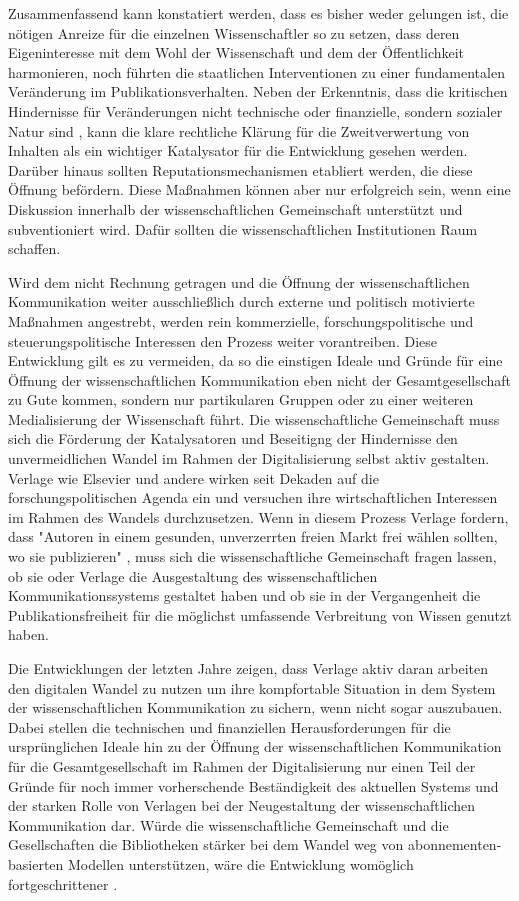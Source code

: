 Zusammenfassend kann konstatiert werden, dass es bisher weder gelungen ist, die nötigen Anreize für die einzelnen Wissenschaftler so zu setzen, dass deren Eigeninteresse mit dem Wohl der Wissenschaft und dem der Öffentlichkeit harmonieren, noch führten die staatlichen Interventionen zu einer fundamentalen Veränderung im Publikationsverhalten. Neben der Erkenntnis, dass die kritischen Hindernisse für Veränderungen nicht technische oder finanzielle, sondern sozialer Natur sind \cite{nosek_2012_scientific}, kann die klare rechtliche Klärung für die Zweitverwertung von Inhalten als ein wichtiger Katalysator für die Entwicklung gesehen werden. Darüber hinaus sollten Reputationsmechanismen etabliert werden, die diese Öffnung befördern. Diese Maßnahmen können aber nur erfolgreich sein, wenn eine Diskussion innerhalb der wissenschaftlichen Gemeinschaft unterstützt und subventioniert wird. Dafür sollten die wissenschaftlichen Institutionen Raum schaffen.

Wird dem nicht Rechnung getragen und die Öffnung der wissenschaftlichen Kommunikation weiter ausschließlich durch externe und politisch motivierte Maßnahmen angestrebt, werden rein kommerzielle, forschungspolitische und steuerungspolitische Interessen den Prozess weiter vorantreiben. Diese Entwicklung gilt es zu vermeiden, da so die einstigen Ideale und Gründe für eine Öffnung der wissenschaftlichen Kommunikation eben nicht der Gesamtgesellschaft zu Gute kommen, sondern nur partikularen Gruppen oder zu einer weiteren Medialisierung der Wissenschaft führt. Die wissenschaftliche Gemeinschaft muss sich die Förderung der Katalysatoren und Beseitigng der Hindernisse den unvermeidlichen Wandel im Rahmen der Digitalisierung selbst aktiv gestalten. Verlage wie Elsevier und andere wirken seit Dekaden auf die forschungspolitischen Agenda ein und versuchen ihre wirtschaftlichen Interessen im Rahmen des Wandels durchzusetzen. Wenn in diesem Prozess Verlage fordern, dass "Autoren in einem gesunden, unverzerrten freien Markt frei wählen sollten, wo sie publizieren" \cite{Brussels_Declaration_2007}, muss sich die wissenschaftliche Gemeinschaft fragen lassen, ob sie oder Verlage die Ausgestaltung des wissenschaftlichen Kommunikationssystems gestaltet haben und ob sie in der Vergangenheit die Publikationsfreiheit für die möglichst umfassende Verbreitung von Wissen genutzt haben.

Die Entwicklungen der letzten Jahre zeigen, dass Verlage aktiv daran arbeiten den digitalen Wandel zu nutzen um ihre kompfortable Situation in dem System der wissenschaftlichen Kommunikation zu sichern, wenn nicht sogar auszubauen. Dabei stellen die technischen und finanziellen Herausforderungen für die ursprünglichen Ideale hin zu der Öffnung der wissenschaftlichen Kommunikation für die Gesamtgesellschaft im Rahmen der Digitalisierung nur einen Teil der Gründe für noch immer vorherschende Beständigkeit des aktuellen Systems und der starken Rolle von Verlagen bei der Neugestaltung der wissenschaftlichen Kommunikation dar. Würde die wissenschaftliche Gemeinschaft und die Gesellschaften die Bibliotheken stärker bei dem Wandel weg von abonnementen-basierten Modellen unterstützen, wäre die Entwicklung womöglich fortgeschrittener \cite{nosek_2012_scientific}.

